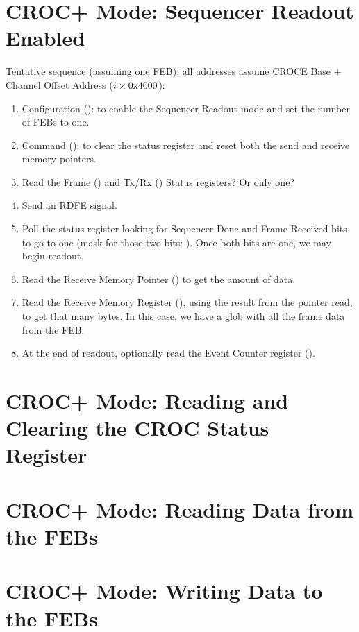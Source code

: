 \section{CROC+ Mode: Sequencer Readout Enabled}
\label{sec:seqreadenab}

Tentative sequence (assuming one FEB); all addresses assume CROCE Base + Channel Offset Address ($i \times \text{0x4000}$):
\begin{enumerate}
\item Configuration ():  to enable the Sequencer Readout mode and set the number of FEBs to one.
\item Command ():  to clear the status register and reset both the send and receive memory pointers.
\item Read the Frame () and Tx/Rx () Status registers? Or only one?
\item Send an RDFE signal.
\item Poll the status register looking for Sequencer Done and Frame Received bits to go to one (mask for those two bits: ). Once both bits are one, we may begin readout.
\item Read the Receive Memory Pointer () to get the amount of data.
\item Read the Receive Memory Register (), using the result from the pointer read, to get that many bytes. In this case, we have a glob with all the frame data from the FEB.
\item At the end of readout, optionally read the Event Counter register ().
\end{enumerate}

\section{CROC+ Mode: Reading and Clearing the CROC Status Register}
\label{sec:readandclearcrocstatus}



\section{CROC+ Mode: Reading Data from the FEBs}
\label{sec:readfromfebs}


\section{CROC+ Mode: Writing Data to the FEBs}
\label{sec:writetofebs}






